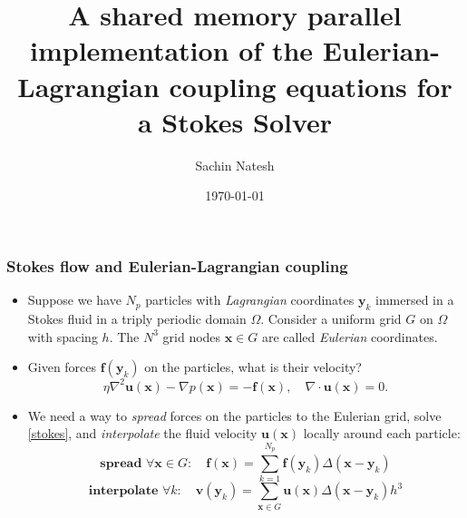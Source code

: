 \documentclass[10pt]{beamer}
\title[Parallel spreading and interpolation]{A shared memory parallel implementation of the Eulerian-Lagrangian coupling equations for a Stokes Solver}
\author{Sachin Natesh}
\institute{Courant Institute, NYU}
\date{\today}
\newcommand{\bs}{\boldsymbol}
\begin{document}
\begin{frame}
\titlepage
\end{frame}

\section[]{}

\begin{frame}
\frametitle{Stokes flow and Eulerian-Lagrangian coupling}
\begin{itemize}
	\item Suppose we have $N_p$ particles with \emph{Lagrangian} coordinates $\bs y_k$ immersed in a Stokes fluid in a triply periodic domain $\Omega$. Consider a uniform grid $G$ on $\Omega$ with spacing $h$. The $N^3$ grid nodes $\bs x \in G$ are called \emph{Eulerian} coordinates.
	\item Given forces $\bs f(\bs y_k)$ on the particles, what is their velocity?
	\begin{equation}\label{stokes}
	\eta \nabla^2 \bs{u}(\bs x) - \nabla p(\bs x) = -\bs f(\bs x),\quad \nabla \cdot \bs u(\bs x) = 0.
	\end{equation}
	\item We need a way to \emph{spread} forces on the particles to the Eulerian grid, solve \eqref{stokes}, and \emph{interpolate} the fluid velocity $\bs u(\bs x)$ locally around each particle:
	\begin{equation}\label{spread}
	\textbf{spread } \forall \bs x \in G:\quad \bs f(\bs x) = \sum_{k=1}^{N_p} \bs f(\bs y_k)\Delta(\bs x - \bs y_k)
	\end{equation}
	\begin{equation}\label{interp}
	\textbf{interpolate } \forall k:\quad \bs v(\bs y_k) = \sum_{\bs x \in G}\bs u(\bs x)\Delta(\bs x - \bs y_k)h^3
	\end{equation}
\end{itemize} 
\end{frame}
\end{document}
